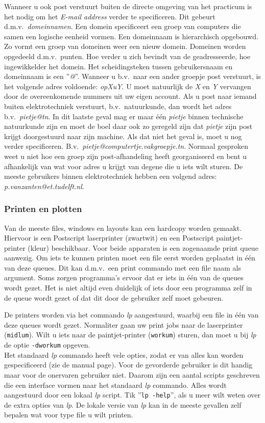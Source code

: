 Wanneer u ook post verstuurt buiten de directe omgeving
van het practicum is het nodig om het {\em E-mail address}
verder te specificeren.
Dit gebeurt d.m.v.\ {\em domeinnamen}.
Een domein specificeert een groep 
van computers die samen een logische eenheid vormen.
Een domeinnaam is hierarchisch opgebouwd.
Zo vormt een groep van domeinen weer een nieuw domein.
Domeinen worden opgedeeld d.m.v.\ punten.
Hoe verder u zich bevindt van de geadresseerde,
hoe ingewikkelder het domein.
Het scheidingsteken tussen gebruikersnaam en domeinnaam is een ''{\em @}''.
Wanneer u b.v.\ naar een ander groepje post verstuurt,
is het volgende adres voldoende: {\em opXuY}.
U moet natuurlijk de {\em X} en {\em Y} vervangen door
de overeenkomende nummers uit uw eigen account.
Als u post naar iemand buiten elektrotechniek verstuurt,
b.v.\ natuurkunde, dan wordt het adres b.v.\ {\em pietje@tn}.
In dit laatste geval mag er maar \'e\'en {\em pietje} binnen technische natuurkunde
zijn en moet de boel daar ook zo geregeld zijn dat {\em pietje} zijn post
krijgt doorgestuurd naar zijn machine.
Als dat niet het geval is,
moet u nog verder specificeren. 
B.v.\ {\em pietje@computertje.vakgroepje.tn}. 
Normaal gesproken weet u niet hoe een groep zijn post-afhandeling heeft
georganiseerd en bent u afhankelijk van wat voor adres u krijgt van degene
die u iets wilt sturen.
De meeste gebruikers binnen elektrotechniek hebben een volgend adres:
{\em p.vanzanten@et.tudelft.nl}. 

\subsubsection{Printen en plotten}
\label{Printen en Plotten}
Van de meeste files, windows en layouts kan een hardcopy
worden gemaakt. 
Hiervoor is een Postscript laserprinter (zwartwit) en
een Postscript paintjet-printer (kleur) beschikbaar.
Voor beide apparaten is een zogenaamde print queue aanwezig.
Om iets te kunnen printen moet een file eerst worden
geplaatst in \'e\'en van deze queues.
Dit kan d.m.v.\ een print commando met een file naam als argument.
Soms zorgen programma's ervoor dat er iets in \'e\'en van de queues
wordt gezet.
Het is niet altijd even duidelijk of iets door een programma
zelf in de queue wordt gezet of dat dit door de gebruiker zelf 
moet gebeuren.

De printers worden via het commando {\em lp} aangestuurd,
waarbij een file in \'e\'en van deze queues wordt gezet.
Normaliter gaan uw print jobs naar de laserprinter ({\tt midlum}).
Wilt u iets naar de paintjet-printer ({\tt workum}) sturen,
dan moet u bij {\em lp} de optie {\tt -dworkum} opgeven.\\
Het standaard {\em lp} commando heeft vele opties,
zodat er van alles kan worden gespecificeerd (zie de manual page).
Voor de gevorderde gebruiker is dit handig maar
voor de onervaren gebruiker niet.
Daarom zijn een aantal scripts geschreven
die een interface vormen naar het standaard {\em lp} commando.
Alles wordt aangestuurd door een lokaal {\em lp} script.
Tik ''{\tt lp -help}'',
als u meer wilt weten over de extra opties van {\em lp}.
De lokale versie van {\em lp} kan in de meeste gevallen zelf bepalen
wat voor type file u wilt printen.

